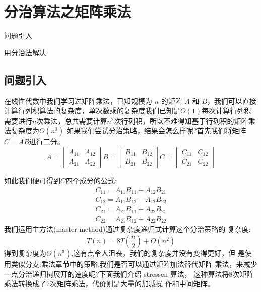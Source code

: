 \chapter{分治算法之矩阵乘法}
\begin{introduction}
	\item 问题引入
	\item 用分治法解决
\end{introduction}
\section{问题引入}
在线性代数中我们学习过矩阵乘法，已知规模为 $n$ 的矩阵 $A$ 和 $B$，我们可以直接计算行列积算法的复杂度，单次数乘的复杂度我们已知是$ O(1)$每次计算行列积需要进行$n$次乘法，总共需要计算$n^2$次行列积，所以不难得知基于行列积的矩阵乘法复杂度为$O(n^3)$
如果我们尝试分治策略，结果会怎么样呢?首先我们将矩阵$C = AB$进行二分。
$$
A=\left[\begin{array}{ll}
A_{11} & A_{12} \\
A_{21} & A_{22}
\end{array}\right] B=\left[\begin{array}{ll}
B_{11} & B_{12} \\
B_{21} & B_{22}
\end{array}\right] C=\left[\begin{array}{ll}
C_{11} & C_{12} \\
C_{21} & C_{22}
\end{array}\right]
$$

如此我们便可得到$C$四个成分的公式:
$$
\begin{array}{l}
C_{11}=A_{11} B_{11}+A_{12} B_{21} \\
C_{12}=A_{11} B_{12}+A_{12} B_{22} \\
C_{21}=A_{21} B_{11}+A_{22} B_{21} \\
C_{22}=A_{21} B_{12}+A_{22} B_{22}
\end{array}
$$
我们运用主方法(master method)通过复杂度递归式计算这个分治策略的 复杂度:
$$
T(n)=8 T\left(\frac{n}{2}\right)+O\left(n^{2}\right)
$$
得到复杂度为$O(n^3)$,这有点令人沮丧，我们的复杂度并没有变得更好，但 是使用类似分支:乘法章节中的策略,我们是否可以通过矩阵加法替代矩阵 乘法，来减少一点分治递归树展开的速度呢?下面我们介绍 stressen 算法， 这种算法将8次矩阵乘法转换成了7次矩阵乘法，代价则是大量的加减操 作和中间矩阵。
